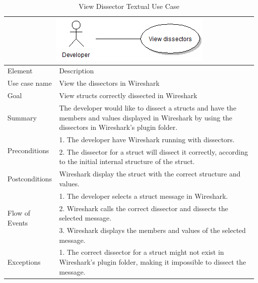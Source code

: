 \begin{table}[htbp] \footnotesize \center
\caption{View Dissector Textual Use Case\label{tab:textual:viewdissector}}
\begin{tabularx}{\textwidth}{l X}
	\multicolumn{2}{c}{\includegraphics[scale=0.8]{./planning/img/uc_viewdissectors}} \\
	\toprule
	Element & Description\\
	\midrule
	Use case name & View the dissectors in Wireshark\\
	Goal & View structs correctly dissected in Wireshark\\
	Summary & The developer would like to dissect a structs and have the members and values displayed in Wireshark by using the dissectors in Wireshark's plugin folder.\\
	\multirow{2}{*}{Preconditions}& 1. The developer have Wireshark running with dissectors. \\
	& 2. The dissector for a struct will dissect it correctly, according to the initial internal structure of the struct. \\
	Postconditions & Wireshark display the struct with the correct structure and values.\\
	\midrule
	\multirow{3}{*}{Flow of Events} & 1. The developer selects a struct message in Wireshark. \\
	& 2. Wireshark calls the correct dissector and dissects the selected message. \\
	& 3. Wireshark displays the members and values of the selected message. \\
	\midrule
	Exceptions & 1. The correct dissector for a struct might not exist in Wireshark's plugin folder, making it impossible to dissect the message. \\
	\bottomrule
\end{tabularx}
\end{table}

